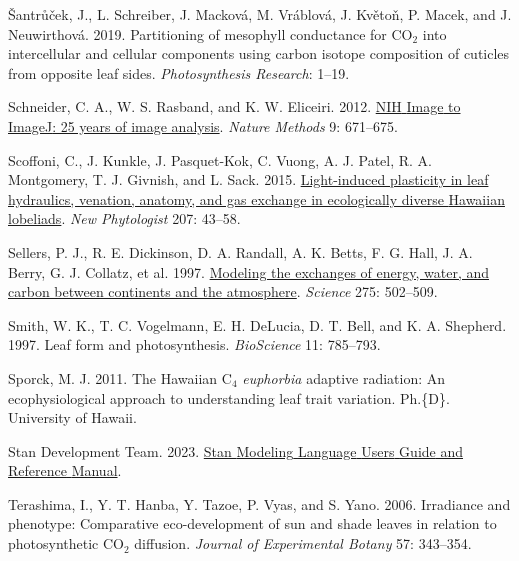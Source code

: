 \documentclass[
  letterpaper,
  DIV=11,
  numbers=noendperiod]{scrartcl}
\newlength{\cslhangindent}
\newlength{\cslentryspacingunit} %
\newenvironment{CSLReferences}[2] %
 {%
  \setlength{\parindent}{0pt}
  \ifodd #1
  \let\oldpar\par
  \def\par{\hangindent=\cslhangindent\oldpar}
  \fi
  \setlength{\parskip}{#2\cslentryspacingunit}
 }%
 {}
\begin{document}
\begin{CSLReferences}{1}{0}
\leavevmode{}%
Šantrůček, J., L. Schreiber, J. Macková, M. Vráblová, J. Květoň, P.
Macek, and J. Neuwirthová. 2019. Partitioning of mesophyll conductance
for {CO}\(_{\textrm{2}}\) into intercellular and cellular components
using carbon isotope composition of cuticles from opposite leaf sides.
\emph{Photosynthesis Research}: 1--19.

\leavevmode{}%
Schneider, C. A., W. S. Rasband, and K. W. Eliceiri. 2012.
\href{https://doi.org/10.1038/nmeth.2089}{{NIH} {Image} to {ImageJ}: 25
years of image analysis}. \emph{Nature Methods} 9: 671--675.

\leavevmode{}%
Scoffoni, C., J. Kunkle, J. Pasquet-Kok, C. Vuong, A. J. Patel, R. A.
Montgomery, T. J. Givnish, and L. Sack. 2015.
\href{https://doi.org/10.1111/nph.13346}{Light-induced plasticity in
leaf hydraulics, venation, anatomy, and gas exchange in ecologically
diverse {Hawaiian} lobeliads}. \emph{New Phytologist} 207: 43--58.

\leavevmode{}%
Sellers, P. J., R. E. Dickinson, D. A. Randall, A. K. Betts, F. G. Hall,
J. A. Berry, G. J. Collatz, et al. 1997.
\href{https://doi.org/10.1126/science.275.5299.502}{Modeling the
exchanges of energy, water, and carbon between continents and the
atmosphere}. \emph{Science} 275: 502--509.

\leavevmode{}%
Smith, W. K., T. C. Vogelmann, E. H. DeLucia, D. T. Bell, and K. A.
Shepherd. 1997. Leaf form and photosynthesis. \emph{BioScience} 11:
785--793.

\leavevmode{}%
Sporck, M. J. 2011. The {Hawaiian} {C}\(_{\textrm{4}}\) \emph{euphorbia}
adaptive radiation: An ecophysiological approach to understanding leaf
trait variation. Ph.\{D\}. University of Hawaii.

\leavevmode{}%
Stan Development Team. 2023. \href{https://mc-stan.org}{Stan {Modeling}
{Language} {Users} {Guide} and {Reference} {Manual}}.

\leavevmode{}%
Terashima, I., Y. T. Hanba, Y. Tazoe, P. Vyas, and S. Yano. 2006.
Irradiance and phenotype: Comparative eco-development of sun and shade
leaves in relation to photosynthetic {CO}\(_{\textrm{2}}\) diffusion.
\emph{Journal of Experimental Botany} 57: 343--354.


\end{CSLReferences}
\end{document}
